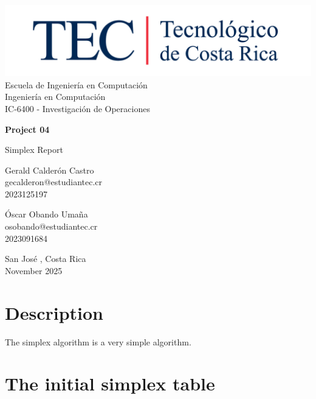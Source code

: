 \documentclass[12pt,a4paper]{report}
\makeatletter
\def \unidad{Escuela de Ingeniería en Computación}
\def \programa{Ingeniería en Computación}
\def \curso{IC-6400 - Investigación de Operaciones}
\def \titulo{Project 04}
\def \subtitulo{Simplex Report}
\def \autores{
    Gerald Calderón Castro\\
    gecalderon@estudiantec.cr\\
    2023125197\\

    \vspace{0.5cm}

    Óscar Obando Umaña\\
    osobando@estudiantec.cr\\
    2023091684
}
\def \fecha{November 2025}
\def \lugar{San José , Costa Rica}
\makeatother
\begin{document}
\begin{titlepage}
    \begin{center}
        \vspace*{1cm}

        \includegraphics[width=0.8\linewidth]{logo_tec.jpg}\\

        \LARGE
        \unidad\\
        \programa\\
        \curso

        \vspace{1cm}

        \Huge
        \textbf{\titulo}

        \vspace{0.5cm}
        \LARGE
        \subtitulo

        \vspace{1.5cm}

        \large
        \autores

        \vfill

        \lugar\\
        \fecha

    \end{center}
\end{titlepage}
\tableofcontents

\section{Description}
The simplex algorithm is a very simple algorithm.
\section{The initial simplex table}
\end{document}
